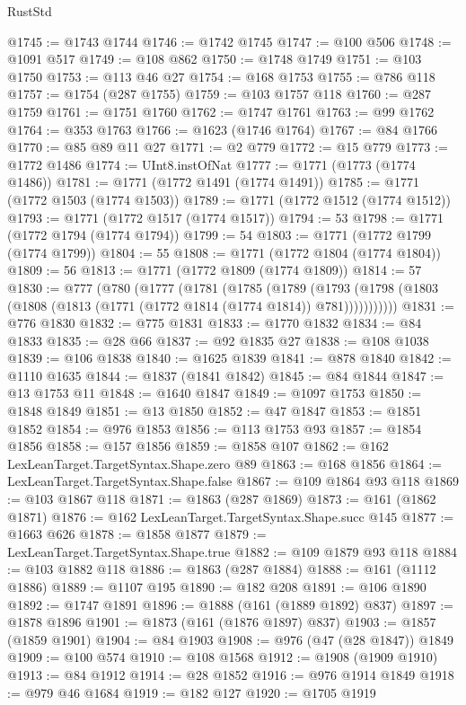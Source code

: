 \begin{lexlean}{RustStd}
\begin{coremodule}
@1745 := @1743 @1744
@1746 := @1742 @1745
@1747 := @100 @506
@1748 := @1091 @517
@1749 := @108 @862
@1750 := @1748 @1749
@1751 := @103 @1750
@1753 := @113 @46 @27
@1754 := @168 @1753
@1755 := @786 @118
@1757 := @1754 (@287 @1755)
@1759 := @103 @1757 @118
@1760 := @287 @1759
@1761 := @1751 @1760
@1762 := @1747 @1761
@1763 := @99 @1762
@1764 := @353 @1763
@1766 := @1623 (@1746 @1764)
@1767 := @84 @1766
@1770 := @85 @89 @11 @27
@1771 := @2 @779
@1772 := @15 @779
@1773 := @1772 @1486
@1774 := UInt8.instOfNat
@1777 := @1771 (@1773 (@1774 @1486))
@1781 := @1771 (@1772 @1491 (@1774 @1491))
@1785 := @1771 (@1772 @1503 (@1774 @1503))
@1789 := @1771 (@1772 @1512 (@1774 @1512))
@1793 := @1771 (@1772 @1517 (@1774 @1517))
@1794 := 53
@1798 := @1771 (@1772 @1794 (@1774 @1794))
@1799 := 54
@1803 := @1771 (@1772 @1799 (@1774 @1799))
@1804 := 55
@1808 := @1771 (@1772 @1804 (@1774 @1804))
@1809 := 56
@1813 := @1771 (@1772 @1809 (@1774 @1809))
@1814 := 57
@1830 := @777
    (@780
      (@1777
        (@1781
          (@1785
            (@1789
              (@1793 (@1798 (@1803 (@1808 (@1813 (@1771 (@1772 @1814 (@1774 @1814)) @781)))))))))))
@1831 := @776 @1830
@1832 := @775 @1831
@1833 := @1770 @1832
@1834 := @84 @1833
@1835 := @28 @66
@1837 := @92 @1835 @27
@1838 := @108 @1038
@1839 := @106 @1838
@1840 := @1625 @1839
@1841 := @878 @1840
@1842 := @1110 @1635
@1844 := @1837 (@1841 @1842)
@1845 := @84 @1844
@1847 := @13 @1753 @11
@1848 := @1640 @1847
@1849 := @1097 @1753
@1850 := @1848 @1849
@1851 := @13 @1850
@1852 := @47 @1847
@1853 := @1851 @1852
@1854 := @976 @1853
@1856 := @113 @1753 @93
@1857 := @1854 @1856
@1858 := @157 @1856
@1859 := @1858 @107
@1862 := @162 LexLeanTarget.TargetSyntax.Shape.zero @89
@1863 := @168 @1856
@1864 := LexLeanTarget.TargetSyntax.Shape.false
@1867 := @109 @1864 @93 @118
@1869 := @103 @1867 @118
@1871 := @1863 (@287 @1869)
@1873 := @161 (@1862 @1871)
@1876 := @162 LexLeanTarget.TargetSyntax.Shape.succ @145
@1877 := @1663 @626
@1878 := @1858 @1877
@1879 := LexLeanTarget.TargetSyntax.Shape.true
@1882 := @109 @1879 @93 @118
@1884 := @103 @1882 @118
@1886 := @1863 (@287 @1884)
@1888 := @161 (@1112 @1886)
@1889 := @1107 @195
@1890 := @182 @208
@1891 := @106 @1890
@1892 := @1747 @1891
@1896 := @1888 (@161 (@1889 @1892) @837)
@1897 := @1878 @1896
@1901 := @1873 (@161 (@1876 @1897) @837)
@1903 := @1857 (@1859 @1901)
@1904 := @84 @1903
@1908 := @976 (@47 (@28 @1847)) @1849
@1909 := @100 @574
@1910 := @108 @1568
@1912 := @1908 (@1909 @1910)
@1913 := @84 @1912
@1914 := @28 @1852
@1916 := @976 @1914 @1849
@1918 := @979 @46 @1684
@1919 := @182 @127
@1920 := @1705 @1919

\end{coremodule}
\end{lexlean}
